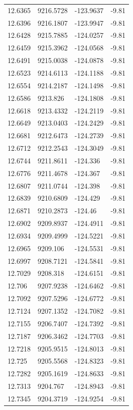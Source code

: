 \begin{table}[H]
\begin{tabular}{llll}
12.6365 & 9216.5728 & -123.9637 & -9.81 \\
12.6396 & 9216.1807 & -123.9947 & -9.81 \\
12.6428 & 9215.7885 & -124.0257 & -9.81 \\
12.6459 & 9215.3962 & -124.0568 & -9.81 \\
12.6491 & 9215.0038 & -124.0878 & -9.81 \\
12.6523 & 9214.6113 & -124.1188 & -9.81 \\
12.6554 & 9214.2187 & -124.1498 & -9.81 \\
12.6586 & 9213.826 & -124.1808 & -9.81 \\
12.6618 & 9213.4332 & -124.2119 & -9.81 \\
12.6649 & 9213.0403 & -124.2429 & -9.81 \\
12.6681 & 9212.6473 & -124.2739 & -9.81 \\
12.6712 & 9212.2543 & -124.3049 & -9.81 \\
12.6744 & 9211.8611 & -124.336 & -9.81 \\
12.6776 & 9211.4678 & -124.367 & -9.81 \\
12.6807 & 9211.0744 & -124.398 & -9.81 \\
12.6839 & 9210.6809 & -124.429 & -9.81 \\
12.6871 & 9210.2873 & -124.46 & -9.81 \\
12.6902 & 9209.8937 & -124.4911 & -9.81 \\
12.6934 & 9209.4999 & -124.5221 & -9.81 \\
12.6965 & 9209.106 & -124.5531 & -9.81 \\
12.6997 & 9208.7121 & -124.5841 & -9.81 \\
12.7029 & 9208.318 & -124.6151 & -9.81 \\
12.706 & 9207.9238 & -124.6462 & -9.81 \\
12.7092 & 9207.5296 & -124.6772 & -9.81 \\
12.7124 & 9207.1352 & -124.7082 & -9.81 \\
12.7155 & 9206.7407 & -124.7392 & -9.81 \\
12.7187 & 9206.3462 & -124.7703 & -9.81 \\
12.7218 & 9205.9515 & -124.8013 & -9.81 \\
12.725 & 9205.5568 & -124.8323 & -9.81 \\
12.7282 & 9205.1619 & -124.8633 & -9.81 \\
12.7313 & 9204.767 & -124.8943 & -9.81 \\
12.7345 & 9204.3719 & -124.9254 & -9.81 \\

\end{tabular}
\end{table}
